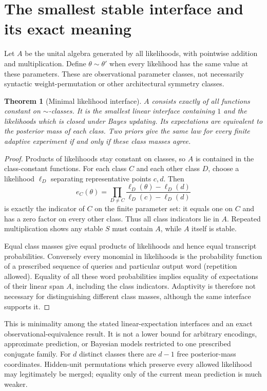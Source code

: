 \documentclass[11pt]{article}
\newtheorem{theorem}{Theorem}
\begin{document}
\section{The smallest stable interface and its exact meaning}
Let $A$ be the unital algebra generated by all likelihoods, with pointwise addition and multiplication. Define $\theta\sim\theta'$ when every likelihood has the same value at these parameters. These are observational parameter classes, not necessarily syntactic weight-permutation or other architectural symmetry classes.
\begin{theorem}[Minimal likelihood interface]\label{thm:minimal}
$A$ consists exactly of all functions constant on $\sim$-classes. It is the smallest linear interface containing $1$ and the likelihoods which is closed under Bayes updating. Its expectations are equivalent to the posterior mass of each class. Two priors give the same law for every finite adaptive experiment if and only if these class masses agree.
\end{theorem}
\begin{proof}
Products of likelihoods stay constant on classes, so $A$ is contained in the class-constant functions. For each class $C$ and each other class $D$, choose a likelihood $\ell_D$ separating representative points $c,d$. Then
\[e_C(\theta)=\prod_{D\ne C}\frac{\ell_D(\theta)-\ell_D(d)}{\ell_D(c)-\ell_D(d)}\]
is exactly the indicator of $C$ on the finite parameter set: it equals one on $C$ and has a zero factor on every other class. Thus all class indicators lie in $A$. Repeated multiplication shows any stable $S$ must contain $A$, while $A$ itself is stable.

Equal class masses give equal products of likelihoods and hence equal transcript probabilities. Conversely every monomial in likelihoods is the probability function of a prescribed sequence of queries and particular output word (repetition allowed). Equality of all these word probabilities implies equality of expectations of their linear span $A$, including the class indicators. Adaptivity is therefore not necessary for distinguishing different class masses, although the same interface supports it.
\end{proof}
This is minimality among the stated linear-expectation interfaces and an exact observational-equivalence result. It is not a lower bound for arbitrary encodings, approximate prediction, or Bayesian models restricted to one prescribed conjugate family. For $d$ distinct classes there are $d-1$ free posterior-mass coordinates. Hidden-unit permutations which preserve every allowed likelihood may legitimately be merged; equality only of the current mean prediction is much weaker.
\end{document}

